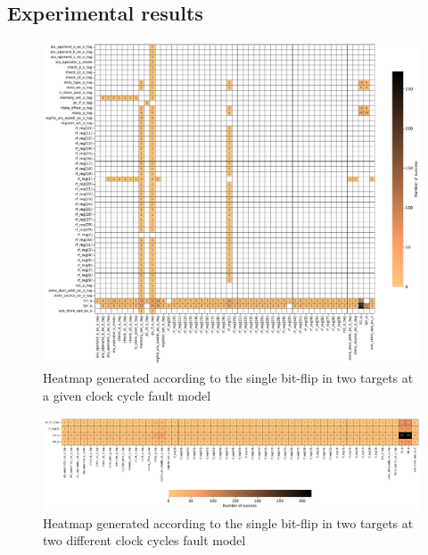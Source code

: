\subsection{Experimental results} 
\label{subsec:results}

\begin{figure}[t]
    \centering
    \includegraphics[width=\textwidth]{c4_fissa/img/heatmap/heatmap_buffer_overflow_wop_1_single_bitflip_spatial_2.pdf}
    \caption{Heatmap generated according to the single bit-flip in two targets at a given clock cycle fault model}
    \label{fig:heatmap_spatial}
\end{figure}

\begin{figure}[t]
    \centering
    \includegraphics[width=\textwidth]{c4_fissa/img/heatmap/heatmap_buffer_overflow_wop_1_single_bitflip_temporel_2.pdf}
    \caption{Heatmap generated according to the single bit-flip in two targets at two different clock cycles fault model}
    \label{fig:heatmap_temporel}
\end{figure}

